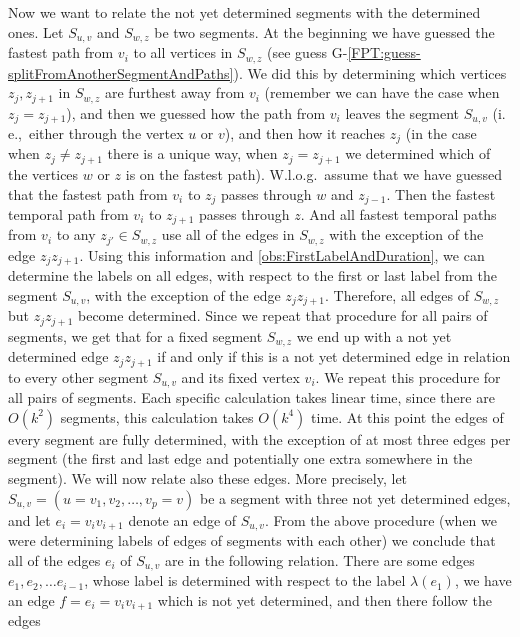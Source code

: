 \documentclass[a4paper,UKenglish,cleveref, autoref, thm-restate]{lipics-v2021}
\newcommand{\ie}{i.\,e.,\ }
\begin{document}
Now we want to relate the not yet determined segments with the determined ones.
Let $S_{u,v}$ and $S_{w,z}$ be two segments.
At the beginning we have guessed the fastest path from $v_i$ to all vertices in $S_{w,z}$ (see guess G-\ref{FPT:guess-splitFromAnotherSegmentAndPaths}).
We did this by determining which vertices $z_j, z_{j+1}$ in $S_{w,z}$ are furthest away from $v_i$
(remember we can have the case when $z_j = z_{j+1}$),
and then we guessed how the path from $v_i$ leaves the segment $S_{u,v}$ (\ie either through the vertex $u$ or $v$),
and then how it reaches $z_j$ (in the case when $z_j \neq z_{j+1}$ there is a unique way,
when $z_j = z_{j+1}$ we determined which of the vertices $w$ or $z$ is on the fastest path).
W.l.o.g.\ assume that we have guessed that the fastest path from $v_i$ to $z_j$
passes through $w$ and $z_{j-1}$.
Then the fastest temporal path from $v_i$ to $z_{j+1}$ passes through $z$.
And all fastest temporal paths from $v_i$ to any $z_{j'} \in S_{w,z}$
use all of the edges in $S_{w,z}$ with the exception of the edge $z_j z_{j+1}$.
Using this information and \cref{obs:FirstLabelAndDuration}, we can determine the labels on all edges, with respect to the first or last label from the segment $S_{u,v}$,
with the exception of the edge $z_j z_{j+1}$.
Therefore, all edges of $S_{w,z}$ but $z_j z_{j+1}$ become determined.
Since we repeat that procedure for all pairs of segments,
we get that for a fixed segment $S_{w,z}$ we end up with a not yet determined edge $z_j z_{j+1}$
if and only if this is a not yet determined edge in relation to every other segment $S_{u,v}$ and its fixed vertex $v_i$.
%
We repeat this procedure for all pairs of segments.
Each specific calculation takes linear time, since there are $O(k^2)$ segments, this calculation takes $O(k^4)$ time.
At this point
the edges of every segment are fully determined, 
with the exception of at most three edges per segment (the first and last edge and potentially one extra somewhere in the segment).
We will now relate also these edges.
More precisely,
let $S_{u,v} = (u=v_1, v_2, \dots, v_p=v)$ be a segment with three not yet determined edges,
and let $e_i =v_iv_{i+1}$ denote an edge of $S_{u,v}$.
From the above procedure (when we were determining labels of edges of segments with each other) 
we conclude that all of the edges $e_i$ of $S_{u,v}$ are in the following relation.
There are some edges $e_1, e_2, \dots e_{i-1}$, whose label is determined with respect to the label $\lambda(e_1)$,
we have an edge $f = e_i = v_i v_{i+1}$ which is not yet determined,
and then there follow the edges
\end{document}
